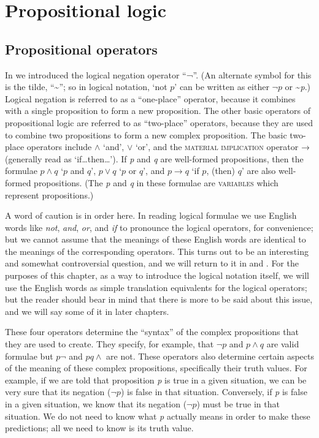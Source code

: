 \section{Propositional logic}\label{sec:4.3}
\subsection{Propositional operators}\label{sec:4.3.1}

In  we introduced the logical negation operator “¬”. (An alternate symbol for this is the tilde, “{\textasciitilde}”; so in logical notation, ‘not $p$’ can be written as either $\neg p$ or {\textasciitilde}\textit{p}.) Logical negation is referred to as a “one-place” operator, because it combines with a single proposition to form a new proposition. The other basic operators of propositional logic are referred to as “two-place” operators, because they are used to combine two propositions to form a new complex proposition. The basic two-place operators include $\wedge$ ‘and’, $\vee$ ‘or’, and the \textsc{material} \textsc{implication} operator → (generally read as ‘if…then…’). If \textit{p} and \textit{q} are well-formed propositions, then the formulae $p \wedge q$ ‘$p$ and $q$’, $p \vee q$ ‘$p$ or $q$’, and $p \rightarrow q$ ‘if $p$, (then) $q$’ are also well-formed propositions. (The \textit{p} and \textit{q} in these formulae are \textsc{variables} which represent propositions.)



A word of caution is in order here. In reading logical formulae we use English words like \textit{not}, \textit{and}, \textit{or}, and \textit{if} to pronounce the logical operators, for convenience; but we cannot assume that the meanings of these English words are identical to the meanings of the corresponding operators. This turns out to be an interesting and somewhat controversial question, and we will return to it in  and . For the purposes of this chapter, as a way to introduce the logical notation itself, we will use the English words as simple translation equivalents for the logical operators; but the reader should bear in mind that there is more to be said about this issue, and we will say some of it in later chapters.



These four operators determine the “syntax” of the complex propositions that they are used to create. They specify, for example, that $\neg p$ and $p \wedge q$ are valid formulae but $p\neg$ and $pq\wedge$ are not. These operators also determine certain aspects of the meaning of these complex propositions, specifically their truth values. For example, if we are told that proposition \textit{p} is true in a given situation, we can be very sure that its negation ($\neg p$) is false in that situation. Conversely, if \textit{p} is false in a given situation, we know that its negation ($\neg p$) must be true in that situation. We do not need to know what \textit{p} actually means in order to make these predictions; all we need to know is its truth value.



